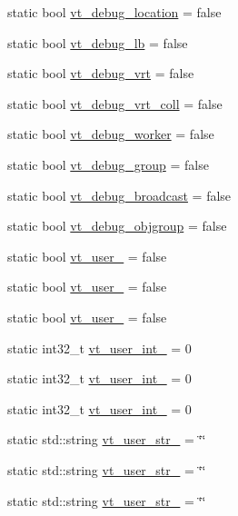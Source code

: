 \begin{DoxyCompactItemize}
\item 
static bool \hyperlink{structvt_1_1arguments_1_1_arg_config_a6aba4c0733b232a7bc1889e063185d75}{vt\+\_\+debug\+\_\+location} = false
\item 
static bool \hyperlink{structvt_1_1arguments_1_1_arg_config_a855ec23d7e91d2d7b6dc102c0e9f4b7a}{vt\+\_\+debug\+\_\+lb} = false
\item 
static bool \hyperlink{structvt_1_1arguments_1_1_arg_config_aa50afb2441de7797225ec882ae42ab73}{vt\+\_\+debug\+\_\+vrt} = false
\item 
static bool \hyperlink{structvt_1_1arguments_1_1_arg_config_ad5a4ae4f09e2cb77100e5622e2d5e690}{vt\+\_\+debug\+\_\+vrt\+\_\+coll} = false
\item 
static bool \hyperlink{structvt_1_1arguments_1_1_arg_config_a6386b3a1d890ff781a16546aefb6d642}{vt\+\_\+debug\+\_\+worker} = false
\item 
static bool \hyperlink{structvt_1_1arguments_1_1_arg_config_a858d2cf937f28c93c34d70ef30365664}{vt\+\_\+debug\+\_\+group} = false
\item 
static bool \hyperlink{structvt_1_1arguments_1_1_arg_config_a95bc48ba7cbf5bc30298d47633a15ea5}{vt\+\_\+debug\+\_\+broadcast} = false
\item 
static bool \hyperlink{structvt_1_1arguments_1_1_arg_config_aec0f3598cdf4a78b578a7ac8eaf6f0fc}{vt\+\_\+debug\+\_\+objgroup} = false
\item 
static bool \hyperlink{structvt_1_1arguments_1_1_arg_config_ad4e433d0d0a5e9cbe39a1045194fff3b}{vt\+\_\+user\+\_} = false
\item 
static bool \hyperlink{structvt_1_1arguments_1_1_arg_config_a0c3fedfb03820032fc87969ff3eabd77}{vt\+\_\+user\+\_} = false
\item 
static bool \hyperlink{structvt_1_1arguments_1_1_arg_config_a91c4c1cdfab2def4254db74c705245f6}{vt\+\_\+user\+\_} = false
\item 
static int32\+\_\+t \hyperlink{structvt_1_1arguments_1_1_arg_config_a8592495c8eb82047645a9b5e0b741907}{vt\+\_\+user\+\_\+int\+\_} = 0
\item 
static int32\+\_\+t \hyperlink{structvt_1_1arguments_1_1_arg_config_ac80c25baf981f06e7f37045371a5336d}{vt\+\_\+user\+\_\+int\+\_} = 0
\item 
static int32\+\_\+t \hyperlink{structvt_1_1arguments_1_1_arg_config_a2dc50d3f0598a0a998923695f681c93a}{vt\+\_\+user\+\_\+int\+\_} = 0
\item 
static std\+::string \hyperlink{structvt_1_1arguments_1_1_arg_config_a892f7cf1b072e8fec60f5b88762f151e}{vt\+\_\+user\+\_\+str\+\_} = \char`\"{}\char`\"{}
\item 
static std\+::string \hyperlink{structvt_1_1arguments_1_1_arg_config_aaac3dd90077934c6faa99570d9b95ca1}{vt\+\_\+user\+\_\+str\+\_} = \char`\"{}\char`\"{}
\item 
static std\+::string \hyperlink{structvt_1_1arguments_1_1_arg_config_a848bd14c34337ef8d48fd740061a4923}{vt\+\_\+user\+\_\+str\+\_} = \char`\"{}\char`\"{}
\end{DoxyCompactItemize}


